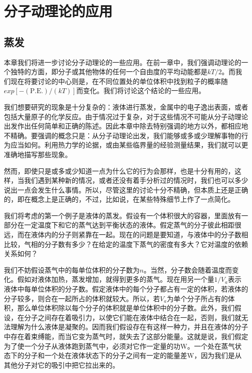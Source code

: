 \chapter{分子动理论的应用}

\section{蒸发}

本章我们将进一步讨论分子动理论的一些应用。在前一章中，我们强调动理论的一个独特的方面，即分子或其他物体的任何一个自由度的平均动能都是$kT/2$。而我们现在将要讨论的中心则是，在不同位置处的单位体积中找到粒子的概率随$exp[-(\text{P.E.})/(kT)]$而变化。我们将讨论这个结论的一些应用。

我们想要研究的现象是十分复杂的：液体进行蒸发，金属中的电子逸出表面，或者包括大量原子的化学反应。由于情况过于复杂，对于这些情况不可能从分子动理论出发作出任何简单和正确的陈述。因此本章中除去特别强调的地方以外，都相应地不精确。要强调的概念只是：从分子动理论出发，我们能够或多或少理解事物的行为应当如何。利用热力学的论据，或由某些临界量的经验测量结果，我们就可以更准确地描写那些现象。

然而，即使只是或多或少知道一点为什么它的行为会那样，也是十分有用的，这样，当我们遇到某种新的情况，或者还没有着手分析过的情况时，我们也可以多少说出一点会发生什么事情。所以，尽管这里的讨论十分不精确，但本质上还是正确的，即在概念上是正确的，不过，比如说，在某些特殊细节上作了一点简化。

我们将考虑的第一个例子是液体的蒸发。假设有一个体积很大的容器，里面放有一部分在一定温度下和它的蒸气达到平衡状态的液体。假定蒸气的分子彼此相距很远，而在液体内的分子则紧靠在一起。现在的问题是要知道，与液体中的分子数相比较，气相的分子数有多少？在给定的温度下蒸气的密度有多大？它对温度的依赖关系如何？

我们不妨假设蒸气中的每单位体积的分子数为$n$。当然，分子数会随着温度而变化。假如对液体加热，蒸发增加，就得到更多的蒸气。现在用另一个量$1/V_a$表示液体中每单位体积的分子数。假定液体中的每个分子都占有一定的体积，若液体的分子较多，则合在一起所占的体积就较大。所以，若$V_a$为单个分子所占有的体积，那么单位体积除以每个分子的体积就是单位体积中的分子数。此外，我们假设，在分子之间存在着吸引力，以使它们能在液体中结合在一起，否则，我们就无法理解为什么液体是凝聚的。因而我们假设存在有这样一种力，并且在液体的分子中存在着束缚能，而当它变为蒸气时，就失去了这部分能量。这就是说，我们假定为了使一个分子从液体跑到蒸气中，必须对它作一定量的功W。一个处在蒸气状态下的分子和一个处在液体状态下的分子之间有一定的能量差W，因为我们是从其他分子对它的吸引中把它拉出来的。

